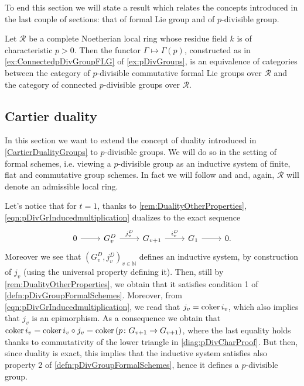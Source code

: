 \noindent
To end this section we will state a result
which relates the concepts introduced in the last couple of sections:
that of formal Lie group and of $p$-divisible group.


\begin{prop}\label{prop:equivCatConnpDivGr}
	Let $\mathscr{R}$ be a complete Noetherian local ring whose residue field $k$
	is of characteristic $p > 0$.
	Then the functor $\Gamma \mapsto \Gamma(p)$, constructed as in \cref{ex:ConnectedpDivGroupFLG}
	of \cref{ex:pDivGroups},
	is an equivalence of categories
	between the category of $p$-divisible commutative formal Lie groups over $\mathscr{R}$
	and the category of connected $p$-divisible groups over $\mathscr{R}$.
\end{prop}



\subsection{Cartier duality}%
In this section we want to extend the concept of duality introduced in \cref{CartierDualityGroups}
to $p$-divisible groups.
We will do so in the setting of formal schemes,
i.e$.$ viewing a $p$-divisible group as an inductive system of finite,
flat and commutative group schemes.
In fact we will follow \cite[\S6]{Shatz} and \cite[\S2.3]{TatePC} and,
again, \(\mathscr{R}\) will denote an admissible local ring.


\begin{rem}[]\label{rem:DualInductiveSystem}
	Let's notice that for $t = 1$, thanks to \cref{rem:DualityOtherProperties}, 
	\cref{eqn:pDivGrInducedmultiplication} dualizes to the exact sequence
	\begin{equation*}
	\begin{tikzcd}
		0 \arrow[r, "", rightarrow] &
		G_v^D \arrow[r, "j_v^D", rightarrow] &
		G_{v+1} \arrow[r, "i_v^D", rightarrow] &
		G_1 \arrow[r, "", rightarrow] &
		0
	.\end{tikzcd}
	\end{equation*}
	Moreover we see that $\left( G_v^D, j_v^D \right)_{v \in \mathbb{N}}$
	defines an inductive system, by construction of $j_v$ (using the universal property
	defining it).
	Then, still by \cref{rem:DualityOtherProperties}, we obtain that it satisfies condition 1
	of \cref{defn:pDivGroupFormalSchemes}.
	Moreover, from \cref{eqn:pDivGrInducedmultiplication}, we read that
	\(j_v = \operatorname{coker} i_v\), which also implies that \(j_v\) is an epimorphism.
	As a consequence we obtain that \(\operatorname{coker} i_v = \operatorname{coker} i_v \circ j_v =
	\operatorname{coker} \left( p\colon G_{v+1} \to G_{v+1} \right)\), where the last
	equality holds thanks to commutativity of 
	the lower triangle in \cref{diag:pDivCharProof}.
	But then, since duality is exact, this implies that the inductive system
	satisfies also property 2 of \cref{defn:pDivGroupFormalSchemes},
	hence it defines a $p$-divisible group.
\end{rem}


